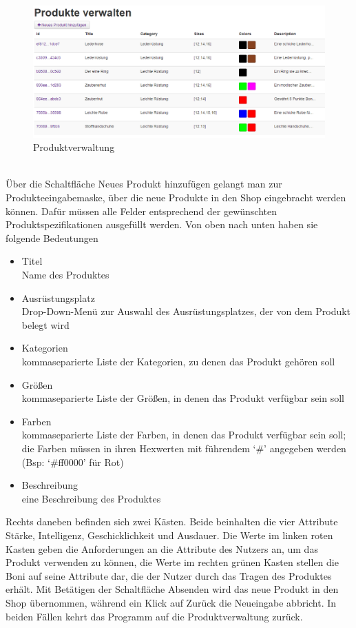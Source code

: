 \begin{figure}[h!]
  \centering
  \includegraphics[width=\textwidth]{UserManual/Produkte.png}
  \caption{Produktverwaltung}
  \label{fig:Produktverwaltung}
\end{figure}
\text{}\vspace*{-1em}\\
Über die Schaltfläche Neues Produkt hinzufügen gelangt man zur Produkteeingabemaske, über die neue Produkte in den Shop eingebracht werden können. Dafür müssen alle Felder entsprechend der gewünschten Produktspezifikationen ausgefüllt werden. Von oben nach unten haben sie folgende Bedeutungen
\begin{itemize}
  \item Titel \\
        Name des Produktes
  \vspace*{-0.5em}
  \item Ausrüstungsplatz \\
        Drop-Down-Menü zur Auswahl  des Ausrüstungsplatzes, der von dem Produkt belegt wird
  \vspace*{-0.5em}
  \item Kategorien \\
        kommaseparierte Liste der Kategorien, zu denen das Produkt gehören soll
  \vspace*{-0.5em}
  \item Größen \\
        kommaseparierte Liste der Größen, in denen das Produkt verfügbar sein soll
  \vspace*{-0.5em}
  \item Farben \\
        kommaseparierte Liste der Farben, in denen das Produkt verfügbar sein soll; die Farben müssen in ihren Hexwerten mit führendem ‘\#’ angegeben werden (Bsp: ‘\#ff0000’ für Rot)
  \vspace*{-0.5em}
  \item Beschreibung \\
        eine Beschreibung des Produktes
\end{itemize}
Rechts daneben befinden sich zwei Kästen. Beide beinhalten die vier Attribute Stärke, Intelligenz, Geschicklichkeit und Ausdauer. Die Werte im linken roten Kasten geben die Anforderungen an die Attribute des Nutzers an, um das Produkt verwenden zu können, die Werte im rechten grünen Kasten stellen die Boni auf seine Attribute dar, die der Nutzer durch das Tragen des Produktes erhält.
Mit Betätigen der Schaltfläche Absenden wird das neue Produkt in den Shop übernommen, während ein Klick auf Zurück die Neueingabe abbricht. In beiden Fällen kehrt das Programm auf die Produktverwaltung zurück.



